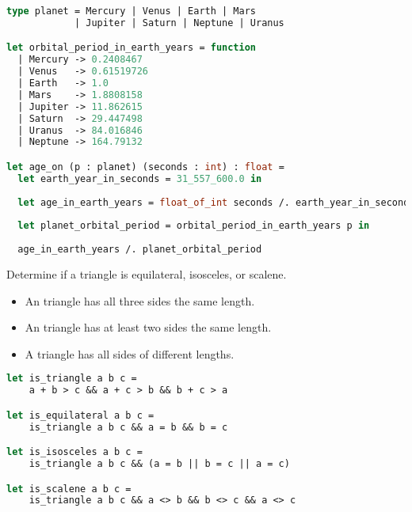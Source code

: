 \begin{lstlisting}[language=OCaml]
type planet = Mercury | Venus | Earth | Mars
            | Jupiter | Saturn | Neptune | Uranus

let orbital_period_in_earth_years = function
  | Mercury -> 0.2408467
  | Venus   -> 0.61519726
  | Earth   -> 1.0
  | Mars    -> 1.8808158
  | Jupiter -> 11.862615
  | Saturn  -> 29.447498
  | Uranus  -> 84.016846
  | Neptune -> 164.79132

let age_on (p : planet) (seconds : int) : float =
  let earth_year_in_seconds = 31_557_600.0 in
  
  let age_in_earth_years = float_of_int seconds /. earth_year_in_seconds in
  
  let planet_orbital_period = orbital_period_in_earth_years p in
  
  age_in_earth_years /. planet_orbital_period

\end{lstlisting}

\problem[Triangle]
Determine if a triangle is equilateral, isosceles, or scalene.

\begin{itemize}
  \item An  triangle has all three sides the same length.
  \item An  triangle has at least two sides the same length.
  \item A  triangle has all sides of different lengths.
\end{itemize}

\begin{lstlisting}[language=OCaml]
let is_triangle a b c =
	a + b > c && a + c > b && b + c > a

let is_equilateral a b c =
	is_triangle a b c && a = b && b = c

let is_isosceles a b c =
	is_triangle a b c && (a = b || b = c || a = c)

let is_scalene a b c =
	is_triangle a b c && a <> b && b <> c && a <> c
\end{lstlisting}

